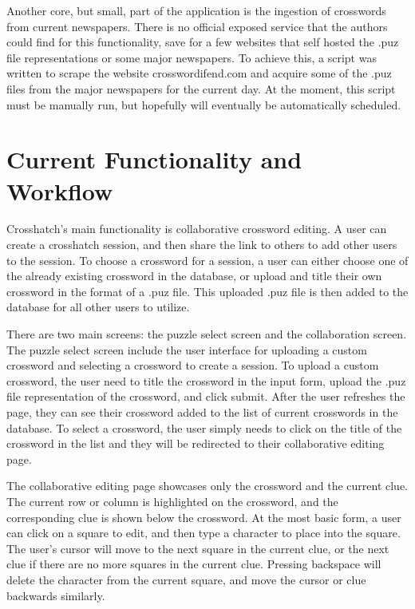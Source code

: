 \documentclass{article}
\begin{document}
Another core, but small, part of the application is the ingestion of crosswords from current newspapers. There is no official exposed service
that the authors could find for this functionality, save for a few websites that self hosted the .puz file representations or some major newspapers.
To achieve this, a script was written to scrape the website crosswordifend.com and acquire some of the .puz files from the major newspapers for the current day.
At the moment, this script must be manually run, but hopefully will eventually be automatically scheduled.

\section{Current Functionality and Workflow}

Crosshatch's main functionality is collaborative crossword editing. A user can create a crosshatch session, and then
share the link to others to add other users to the session. To choose a crossword for a session, a user can either choose one of the 
already existing crossword in the database, or upload and title their own crossword in the format of a .puz file. This uploaded .puz file is then added to the database
for all other users to utilize.

There are two main screens: the puzzle select screen and the collaboration screen. The puzzle select screen include the user interface for uploading a custom crossword
and selecting a crossword to create a session. To upload a custom crossword, the user need to title the crossword in the input form, upload the .puz file representation of the crossword,
and click submit. After the user refreshes the page, they can see their crossword added to the list of current crosswords in the database. To select a crossword,
the user simply needs to click on the title of the crossword in the list and they will be redirected to their collaborative editing page.

The collaborative editing page showcases only the crossword and the current clue. The current row or column is highlighted on the crossword, and the corresponding clue
is shown below the crossword. At the most basic form, a user can click on a square to edit, and then type a character to place into the square. The user's cursor will
move to the next square in the current clue, or the next clue if there are no more squares in the current clue. Pressing backspace will delete the character from the current square,
and move the cursor or clue backwards similarly.
\end{document}
